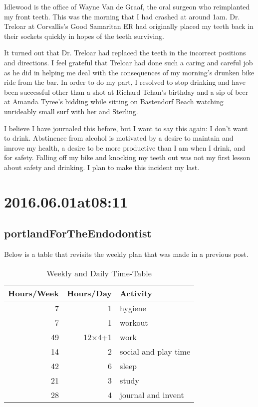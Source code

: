 Idlewood is the office of Wayne Van de Graaf, the oral surgeon who reimplanted my front teeth. This was the morning that I had crashed at around 1am. Dr. Treloar at Corvallis's Good Samaritan ER had originally placed my teeth back in their sockets quickly in hopes of the teeth surviving.

It turned out that Dr. Treloar had replaced the teeth in the incorrect positions and directions. I feel grateful that Treloar had done such a caring and careful job as he did in helping me deal with the consequences of my morning's drunken bike ride from the bar. In order to do my part, I resolved to stop drinking and have been successful other than a shot at Richard Tehan's birthday and a sip of beer at Amanda Tyree's bidding while sitting on Bastendorf Beach watching unrideably small surf with her and Sterling.

I believe I have journaled this before, but I want to say this again: I don't want to drink. Abstinence from alcohol is motivated by a desire to maintain and imrove my health, a desire to be more productive than I am when I drink, and for safety. Falling off my bike and knocking my teeth out was not my first lesson about safety and drinking. I plan to make this incident my last.

\section*{ 2016.06.01at08:11 }
\subsection*{portlandForTheEndodontist}

Below is a table that revisits the weekly plan that was made in a previous post.

\begin{table}
\caption{\label{tab:2016.06.01WeeklyAndDailyTimeTable}Weekly and Daily Time-Table}
\begin{tabular}{|r|r|l|}
\hline
Hours/Week&Hours/Day&Activity\\
\hline
7&1&hygiene\\
7&1&workout\\
49&12$\times$4+1&work\\
14&2&social and play time\\
42&6&sleep\\
21&3&study\\
28&4&journal and invent\\
\hline
\end{tabular}\end{table}

